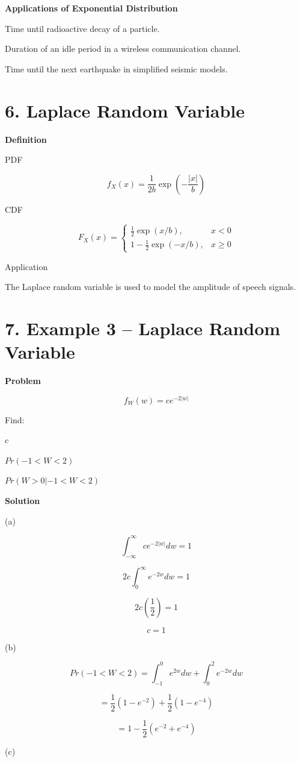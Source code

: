 \documentclass[12pt]{article}
\begin{document}
\textbf{Applications of Exponential Distribution}

Time until radioactive decay of a particle.

Duration of an idle period in a wireless communication channel.

Time until the next earthquake in simplified seismic models.

\section*{6. Laplace Random Variable}

\textbf{Definition}

PDF

\[
f_X(x)=\frac{1}{2b}\exp\left(-\frac{|x|}{b}\right)
\]

CDF

\[
F_X(x)=
\begin{cases}
\frac{1}{2}\exp(x/b), & x<0 \\
1-\frac{1}{2}\exp(-x/b), & x\ge0
\end{cases}
\]

Application

The Laplace random variable is used to model the amplitude of speech signals.

\section*{7. Example 3 – Laplace Random Variable}

\textbf{Problem}

\[
f_W(w)=ce^{-2|w|}
\]

Find:

$c$

$Pr(-1<W<2)$

$Pr(W>0|-1<W<2)$

\textbf{Solution}

(a)

\[
\int_{-\infty}^{\infty}ce^{-2|w|}dw=1
\]

\[
2c\int_{0}^{\infty}e^{-2w}dw=1
\]

\[
2c\left(\frac{1}{2}\right)=1
\]

\[
c=1
\]

(b)

\[
Pr(-1<W<2)=\int_{-1}^{0}e^{2w}dw+\int_{0}^{2}e^{-2w}dw
\]

\[
=\frac{1}{2}(1-e^{-2})+\frac{1}{2}(1-e^{-4})
\]

\[
=1-\frac{1}{2}(e^{-2}+e^{-4})
\]

(c)
\end{document}
